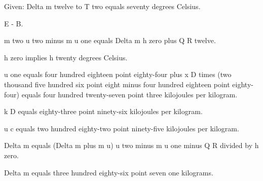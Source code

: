 Given: Delta m twelve to T two equals seventy degrees Celsius.

E - B.

m two u two minus m u one equals Delta m h zero plus Q R twelve.

h zero implies h twenty degrees Celsius.

u one equals four hundred eighteen point eighty-four plus x D times (two thousand five hundred six point eight minus four hundred eighteen point eighty-four) equals four hundred twenty-seven point three kilojoules per kilogram.

k D equals eighty-three point ninety-six kilojoules per kilogram.

u c equals two hundred eighty-two point ninety-five kilojoules per kilogram.

Delta m equals (Delta m plus m u) u two minus m u one minus Q R divided by h zero.

Delta m equals three hundred eighty-six point seven one kilograms.